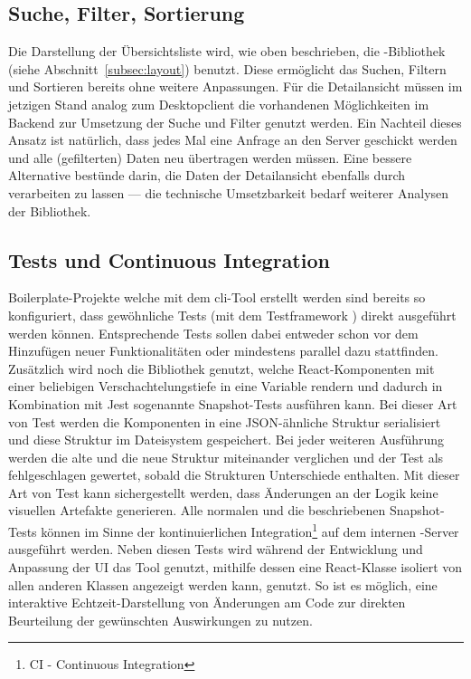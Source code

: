 \subsection{Suche, Filter, Sortierung}
Die Darstellung der Übersichtsliste wird, wie oben beschrieben, die -Bibliothek  (siehe Abschnitt~\ref{subsec:layout}) benutzt. Diese ermöglicht das Suchen, Filtern und Sortieren bereits ohne weitere Anpassungen. Für die Detailansicht müssen im jetzigen Stand analog zum Desktopclient die vorhandenen Möglichkeiten im Backend zur Umsetzung der Suche und Filter genutzt werden. Ein Nachteil dieses Ansatz ist natürlich, dass jedes Mal eine Anfrage an den Server geschickt werden und alle (gefilterten) Daten neu übertragen werden müssen. Eine bessere Alternative bestünde darin, die Daten der Detailansicht ebenfalls durch  verarbeiten zu lassen --- die technische Umsetzbarkeit bedarf weiterer Analysen der Bibliothek.

\subsection{Tests und Continuous Integration}
Boilerplate-Projekte welche mit dem \gls{cli}-Tool  erstellt werden sind bereits so konfiguriert, dass gewöhnliche Tests (mit dem Testframework ) direkt ausgeführt werden können. Entsprechende Tests sollen dabei entweder schon vor dem Hinzufügen neuer Funktionalitäten oder mindestens parallel dazu stattfinden. Zusätzlich wird noch die Bibliothek  genutzt, welche React-Komponenten mit einer beliebigen Verschachtelungstiefe in eine Variable rendern und dadurch in Kombination mit Jest sogenannte Snapshot-Tests ausführen kann. Bei dieser Art von Test werden die Komponenten in eine JSON-ähnliche Struktur serialisiert und diese Struktur im Dateisystem gespeichert. Bei jeder weiteren Ausführung werden die alte und die neue Struktur miteinander verglichen und der Test als fehlgeschlagen gewertet, sobald die Strukturen Unterschiede enthalten. Mit dieser Art von Test kann sichergestellt werden, dass Änderungen an der Logik keine visuellen Artefakte generieren. Alle normalen und die beschriebenen Snapshot-Tests können im Sinne der kontinuierlichen Integration\footnote{CI - Continuous Integration} auf dem internen -Server ausgeführt werden.
Neben diesen Tests wird während der Entwicklung und Anpassung der UI das Tool  genutzt, mithilfe dessen eine React-Klasse isoliert von allen anderen Klassen angezeigt werden kann, genutzt. So ist es möglich, eine interaktive Echtzeit-Darstellung von Änderungen am Code zur direkten Beurteilung der gewünschten Auswirkungen zu nutzen.

